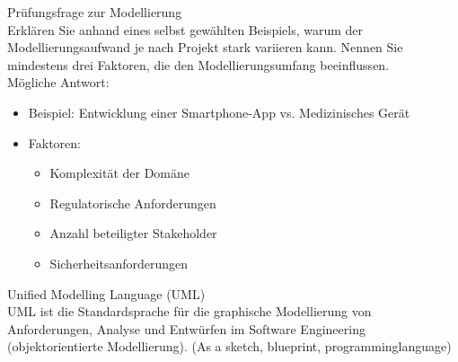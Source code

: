 \begin{example2}{Prüfungsfrage zur Modellierung}\\
Erklären Sie anhand eines selbst gewählten Beispiels, warum der Modellierungsaufwand je nach Projekt stark variieren kann. Nennen Sie mindestens drei Faktoren, die den Modellierungsumfang beeinflussen.
\vspace{3mm}\\
Mögliche Antwort:
\begin{itemize}
    \item Beispiel: Entwicklung einer Smartphone-App vs. Medizinisches Gerät
    \item Faktoren:
    \begin{itemize}
        \item Komplexität der Domäne
        \item Regulatorische Anforderungen
        \item Anzahl beteiligter Stakeholder
        \item Sicherheitsanforderungen
    \end{itemize}
\end{itemize}
\end{example2}

\begin{definition}{Unified Modelling Language (UML)}\\
UML ist die Standardsprache für die graphische Modellierung von Anforderungen, Analyse und Entwürfen im Software Engineering (objektorientierte Modellierung). (As a sketch, blueprint, programminglanguage)
\end{definition}

